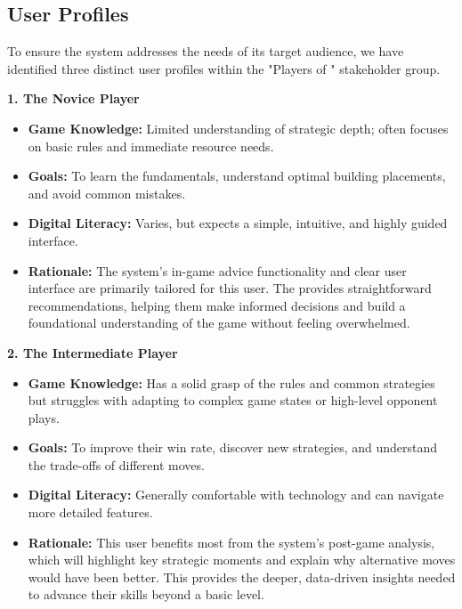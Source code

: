 \documentclass{article}
\begin{document}
\subsection{User Profiles}\label{subsec:User Profiles}
To ensure the system addresses the needs of its target audience, we have identified three distinct user profiles within the "Players of \emph{\Catan{}}" stakeholder group.

\hspace{1cm}

\noindent\textbf{1. The Novice Player}
\begin{itemize}
    \item \textbf{Game Knowledge:} Limited understanding of strategic depth; often focuses on basic rules and immediate resource needs.
    \item \textbf{Goals:} To learn the fundamentals, understand optimal building placements, and avoid common mistakes.
    \item \textbf{Digital Literacy:} Varies, but expects a simple, intuitive, and highly guided interface.
    \item \textbf{Rationale:} The system's in-game advice functionality and clear user interface are primarily tailored for this user. The \AI{} provides straightforward recommendations, helping them make informed decisions and build a foundational understanding of the game without feeling overwhelmed.
\end{itemize}

\noindent\textbf{2. The Intermediate Player}
\begin{itemize}
    \item \textbf{Game Knowledge:} Has a solid grasp of the rules and common strategies but struggles with adapting to complex game states or high-level opponent plays.
    \item \textbf{Goals:} To improve their win rate, discover new strategies, and understand the trade-offs of different moves.
    \item \textbf{Digital Literacy:} Generally comfortable with technology and can navigate more detailed features.
    \item \textbf{Rationale:} This user benefits most from the system's post-game analysis, which will highlight key strategic moments and explain why alternative moves would have been better. This provides the deeper, data-driven insights needed to advance their skills beyond a basic level.
\end{itemize}
\end{document}
